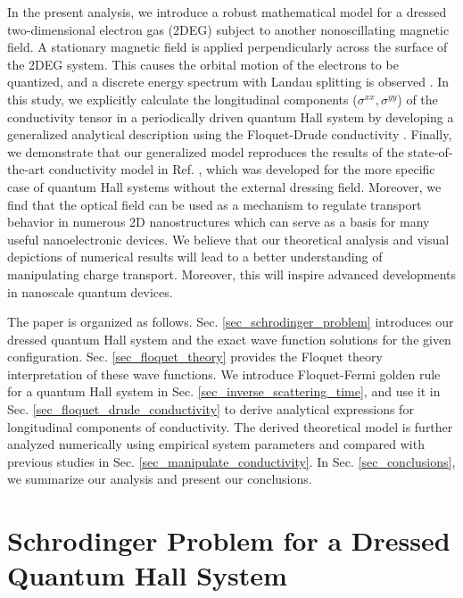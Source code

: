 \documentclass[
 reprint,
 amsmath,amssymb,
 aps,
 prb,
]{revtex4-2}
\begin{document}
In the present analysis, we introduce a robust mathematical model for a dressed two-dimensional electron gas (2DEG) subject to another nonoscillating magnetic field.
A stationary magnetic field is applied perpendicularly across the surface of the 2DEG system. This causes the orbital motion of the electrons to be quantized, and a discrete energy spectrum with Landau splitting is observed \cite{landau30}.
In this study, we explicitly calculate the longitudinal components ($\sigma^{xx},\sigma^{yy}$) of the conductivity tensor in a periodically driven quantum Hall system by developing a generalized analytical description using the Floquet-Drude conductivity \cite{wackerl20}.
Finally, we demonstrate that our generalized model reproduces the results of the state-of-the-art conductivity model in Ref. \cite{endo09}, which was developed for the more specific case of quantum Hall systems without the external dressing field.
Moreover, we find that the optical field can be used as a mechanism to regulate transport behavior in numerous 2D nanostructures which can serve as a basis for many useful nanoelectronic devices. We believe that our theoretical analysis and visual depictions of numerical results will lead to a better understanding of manipulating charge transport. Moreover, this will inspire advanced  developments in nanoscale quantum devices.

The paper is organized as follows. Sec.  \ref{sec_schrodinger_problem} introduces our dressed quantum Hall system and the exact wave function solutions for the given configuration. Sec. \ref{sec_floquet_theory} provides the Floquet theory interpretation of these wave functions.
We introduce Floquet-Fermi golden rule for a quantum Hall system in Sec. \ref{sec_inverse_scattering_time}, and use it in Sec. \ref{sec_floquet_drude_conductivity} to derive analytical expressions for longitudinal components of conductivity.
The derived theoretical model is further analyzed numerically using empirical system parameters and compared with previous studies in Sec. \ref{sec_manipulate_conductivity}.
In Sec. \ref{sec_conclusions}, we summarize our analysis and present our conclusions.

\section{\label{sec_schrodinger_problem} Schrodinger Problem for a Dressed Quantum Hall System}
\end{document}
